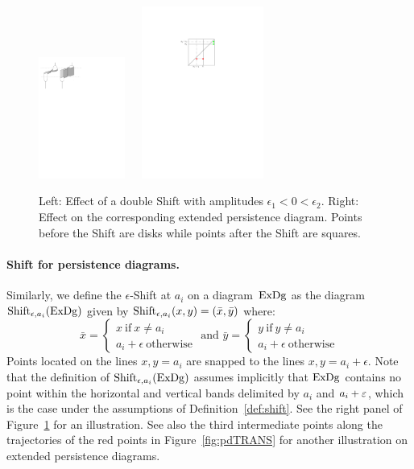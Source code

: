 \begin{figure}[h!]\begin{center}
\includegraphics[height=4cm]{figures/ShiftSpace}\ \ \ \includegraphics[width = 4cm]{figures/ShiftPD}
\caption[Shift]{\label{fig:shiftspace} Left: Effect of a double Shift with
  amplitudes $\epsilon_1<0<\epsilon_2$. %
  Right: Effect on the corresponding
  extended persistence diagram. Points before the Shift are disks while
  points after the Shift are squares.}
\end{center}\end{figure}



\paragraph*{Shift for persistence diagrams.} Similarly, we
define the $\epsilon$-Shift at $a_i$ on a diagram~$\mathrm{ExDg}$
as the diagram
$\mathrm{Shift}_{\epsilon,a_i}(\mathrm{ExDg})$ given by $\mathrm{Shift}_{\epsilon,a_i}(x,y)= (\bar x, \bar y)$ where:
%
\[
\bar x = \left\{\begin{array}{l}
x\ \mbox{if}\ x\neq a_i\\
a_i+\epsilon\ \mbox{otherwise}
\end{array}\right.
\text{ and }
\bar y = \left\{\begin{array}{l}
y\ \mbox{if}\ y\neq a_i\\
a_i+\epsilon\ \mbox{otherwise}
\end{array}\right.
\]
%
Points located on the lines $x,y=a_i$ are snapped to the lines
$x,y=a_i+\epsilon$.  Note that the definition of
$\mathrm{Shift}_{\epsilon,a_i}(\mathrm{ExDg})$ assumes implicitly that $\mathrm{ExDg}$ contains no
point within the horizontal and vertical bands delimited by $a_i$ and
$a_i+\varepsilon$, which is the case under the assumptions of
Definition~\ref{def:shift}.  See the right panel of
Figure~\ref{fig:shiftspace} for an illustration. See also the third
intermediate points along the trajectories of the red points in
Figure~\ref{fig:pdTRANS} for another illustration on extended
persistence diagrams. 

